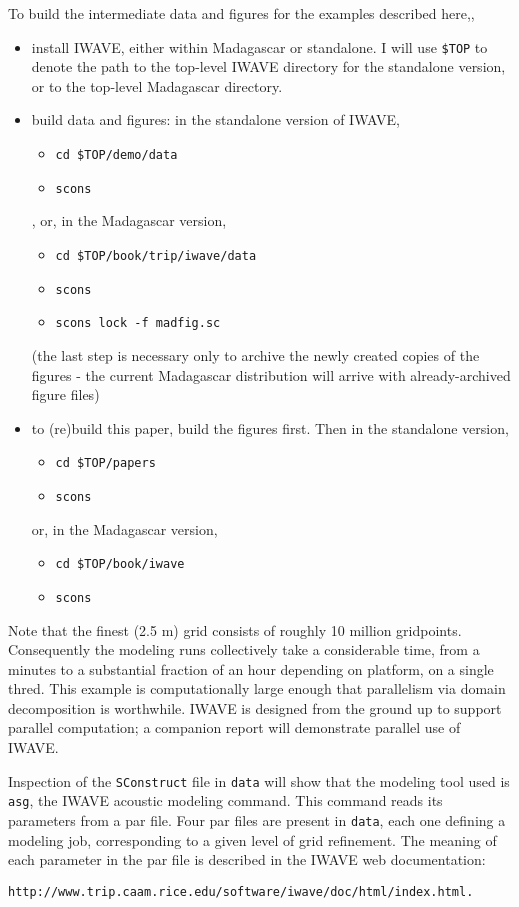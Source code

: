 To build the intermediate data and figures for  the examples described
here,,
\begin{itemize}
\item install IWAVE, either within Madagascar or standalone. I will use  {\tt \$TOP} to denote
  the path to the top-level IWAVE directory for the standalone
  version, or to the top-level Madagascar directory.
\item build data and figures: in the standalone version of IWAVE,
\begin{itemize}
  \item {\tt cd \$TOP/demo/data}
\item {\tt scons}
\end{itemize},
or, in the Madagascar version,
\begin{itemize}
\item {\tt cd \$TOP/book/trip/iwave/data}
\item {\tt scons}
\item {\tt scons lock -f madfig.sc}
\end{itemize}
(the last step is necessary only to archive the newly created copies
of the figures - the current Madagascar distribution will arrive with
already-archived figure files)
\item to (re)build this paper, build the figures first. Then in the standalone version,
\begin{itemize}
\item {\tt cd \$TOP/papers}
\item {\tt scons}
\end{itemize} 
or, in the Madagascar version,
\begin{itemize}
\item {\tt cd \$TOP/book/iwave}
\item {\tt scons}
\end{itemize}

\end{itemize}
Note that the finest (2.5 m) grid consists of roughly 10 million
gridpoints. Consequently the modeling runs collectively take a
considerable time, from a minutes to a substantial fraction of an hour
depending on platform,
on a single thred. This example is computationally large enough that
parallelism via domain decomposition is worthwhile. IWAVE is designed
from the ground up to support parallel computation; a companion report
will demonstrate parallel use of IWAVE.

Inspection of the {\tt SConstruct} file in {\tt data} will show that
the modeling tool used is {\tt asg}, the IWAVE
acoustic modeling command. This command reads its parameters from a
par file. Four par files are present in {\tt data}, each one defining
a modeling job, corresponding to a given level of grid refinement. The
meaning of each parameter in the par file is described in the IWAVE
web documentation:
\begin{verbatim}
http://www.trip.caam.rice.edu/software/iwave/doc/html/index.html.
\end{verbatim}

